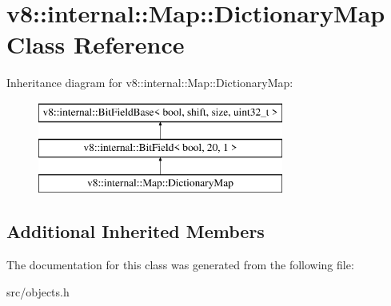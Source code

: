 \hypertarget{classv8_1_1internal_1_1_map_1_1_dictionary_map}{}\section{v8\+:\+:internal\+:\+:Map\+:\+:Dictionary\+Map Class Reference}
\label{classv8_1_1internal_1_1_map_1_1_dictionary_map}
Inheritance diagram for v8\+:\+:internal\+:\+:Map\+:\+:Dictionary\+Map\+:\begin{figure}[H]
\begin{center}
\leavevmode
\includegraphics[height=3.000000cm]{classv8_1_1internal_1_1_map_1_1_dictionary_map}
\end{center}
\end{figure}
\subsection*{Additional Inherited Members}


The documentation for this class was generated from the following file\+:\begin{DoxyCompactItemize}
\item 
src/objects.\+h\end{DoxyCompactItemize}
